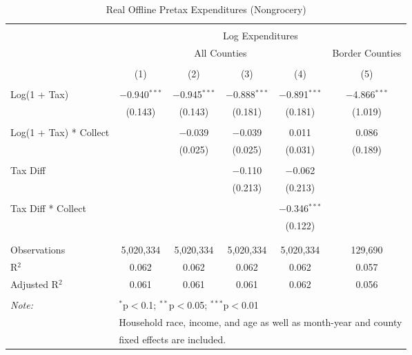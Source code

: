 
\begin{table}[!htbp] \centering 
  \caption{Real Offline Pretax Expenditures (Nongrocery)} 
  \label{} 
\begin{tabular}{@{\extracolsep{5pt}}lccccc} 
\\[-1.8ex]\hline 
\hline \\[-1.8ex] 
 & \multicolumn{5}{c}{Log Expenditures} \\ 
\cline{2-6} 
 & \multicolumn{4}{c}{All Counties} & Border Counties \\ 
\\[-1.8ex] & (1) & (2) & (3) & (4) & (5)\\ 
\hline \\[-1.8ex] 
 Log(1 + Tax) & $-$0.940$^{***}$ & $-$0.945$^{***}$ & $-$0.888$^{***}$ & $-$0.891$^{***}$ & $-$4.866$^{***}$ \\ 
  & (0.143) & (0.143) & (0.181) & (0.181) & (1.019) \\ 
  & & & & & \\ 
 Log(1 + Tax) * Collect &  & $-$0.039 & $-$0.039 & 0.011 & 0.086 \\ 
  &  & (0.025) & (0.025) & (0.031) & (0.189) \\ 
  & & & & & \\ 
 Tax Diff &  &  & $-$0.110 & $-$0.062 &  \\ 
  &  &  & (0.213) & (0.213) &  \\ 
  & & & & & \\ 
 Tax Diff * Collect &  &  &  & $-$0.346$^{***}$ &  \\ 
  &  &  &  & (0.122) &  \\ 
  & & & & & \\ 
\hline \\[-1.8ex] 
Observations & 5,020,334 & 5,020,334 & 5,020,334 & 5,020,334 & 129,690 \\ 
R$^{2}$ & 0.062 & 0.062 & 0.062 & 0.062 & 0.057 \\ 
Adjusted R$^{2}$ & 0.061 & 0.061 & 0.061 & 0.062 & 0.056 \\ 
\hline 
\hline \\[-1.8ex] 
\textit{Note:}  & \multicolumn{5}{l}{$^{*}$p$<$0.1; $^{**}$p$<$0.05; $^{***}$p$<$0.01} \\ 
 & \multicolumn{5}{l}{Household race, income, and age as well as month-year and county} \\ 
 & \multicolumn{5}{l}{fixed effects are included.} \\ 
\end{tabular} 
\end{table} 
